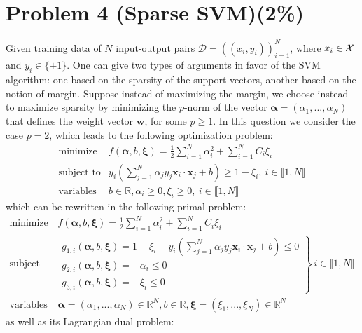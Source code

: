 \documentclass{article}
\newcommand{\real}{\mathbb{R}}
\def\vecw{{\mathbf w}}
\def\vecx{{\mathbf x}}
\def\vecalpha{{\mathbf \alpha}}
\def\vecxi{{\boldsymbol \xi}}
\def\real{{\mathbb {R}}}
\def\calX{{\cal X}}
\def\scrD{\mathscr{D}}
\begin{document}
\section*{Problem 4 (Sparse SVM)(2\%)}

 Given training data of $N$ input-output pairs $\scrD = ((x_i,y_i))_{i=1}^N$, where $x_i \in \calX$ and $y_i \in \{\pm 1\}$. One can give two types of arguments in favor of the SVM algorithm: one based on the sparsity of the support vectors, another based on the notion of margin.  Suppose instead of maximizing the margin, we choose instead to maximize sparsity by minimizing the $p$-norm of the vector $\vecalpha = (\alpha_1,...,\alpha_N)$ that defines the weight vector $\vecw$, for some $p \geq 1$. In this question we consider the case $p=2$, which leads to the following optimization problem:
\begin{equation*}
\begin{array}{ll}
\mbox{minimize} 	& f(\vecalpha,b,\vecxi) = \frac{1}{2}\sum_{i=1}^N \alpha_i^2 + \sum_{i=1}^N C_i \xi_i\\
\mbox{subject to} 	& y_i\left(\sum_{j=1}^N \alpha_j y_j \vecx_i \cdot \vecx_j + b\right) \geq 1 - \xi_i, ~ i \in \llbracket 1,N \rrbracket\\
\mbox{variables} 	& b \in \real, \alpha_i \geq 0, \xi_i \geq 0, ~ i \in \llbracket 1,N \rrbracket
\end{array}
\end{equation*}
%
which can be rewritten in the following primal problem:
\begin{equation}\label{eq:sparse_svm_primal}
\begin{array}{ll}
\mbox{minimize} 	& f(\vecalpha,b,\vecxi) = \frac{1}{2}\sum_{i=1}^N \alpha_i^2 + \sum_{i=1}^N C_i \xi_i\\
\mbox{subject to} 	& \left.\begin{array}{l}
g_{1,i}(\vecalpha,b,\vecxi) = 1 - \xi_i - y_i\left(\sum_{j=1}^N \alpha_j y_j \vecx_i \cdot \vecx_j + b\right) \leq 0\\
g_{2,i}(\vecalpha,b,\vecxi) = -\alpha_i \leq 0\\
g_{3,i}(\vecalpha,b,\vecxi) = -\xi_i \leq 0
\end{array}\right\} ~ i \in \llbracket 1,N \rrbracket\\
\mbox{variables} 	& \vecalpha = (\alpha_1,...,\alpha_N) \in \real^N, b \in \real, \vecxi = (\xi_1,...,\xi_N) \in \real^N
\end{array}
\end{equation}
%
as well as its Lagrangian dual problem:
\end{document}
